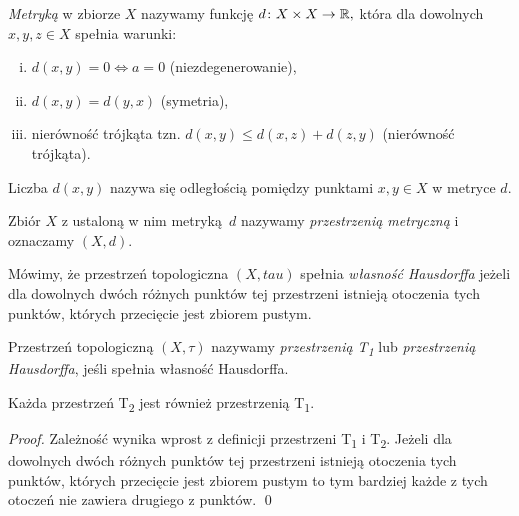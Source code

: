 {\begin{definition}
    \end{definition}
    \begin{definition}[Metryka]
        \label{def:metric}
        \emph{Metryką} w zbiorze $X$ nazywamy funkcję $d\colon X\times X\rightarrow \mathbb{R},$ która dla dowolnych $x, y, z\in X$ spełnia warunki:
        \begin{enumerate}[(i)]
            \item $d(x, y) = 0 \iff a = 0$ (niezdegenerowanie),
            \item $d(x, y) = d(y, x)$ (symetria),
            \item nierówność trójkąta tzn. $d(x, y) \leq d(x, z) + d(z, y)$ (nierówność trójkąta).
        \end{enumerate}            
    \end{definition}
    Liczba $d(x, y)$ nazywa się odległością pomiędzy punktami $x, y\in X$ w metryce $d$.
    \begin{definition}
        \label{def:metric_space}
        Zbiór $X$ z ustaloną w nim metryką~$d$ nazywamy \emph{przestrzenią metryczną} i oznaczamy $(X, d)$.
    \end{definition}
    \begin{definition}
        Mówimy, że przestrzeń topologiczna $(X, tau)$ spełnia \emph{własność Hausdorffa} jeżeli dla dowolnych dwóch różnych punktów tej przestrzeni istnieją otoczenia tych punktów, których przecięcie jest zbiorem pustym.
    \end{definition}
    \begin{definition}
        Przestrzeń topologiczną $(X, \tau)$ nazywamy \emph{przestrzenią T\textsubscript{1}} lub \emph{przestrzenią Hausdorffa}, jeśli spełnia własność Hausdorffa.
    \end{definition}
    \begin{remark}
        Każda przestrzeń T\textsubscript{2} jest również przestrzenią T\textsubscript{1}.
    \end{remark}
    \begin{proof}
        Zależność wynika wprost z definicji przestrzeni T\textsubscript{1} i  T\textsubscript{2}. Jeżeli dla dowolnych dwóch różnych punktów tej przestrzeni istnieją otoczenia tych punktów, których przecięcie jest zbiorem pustym to tym bardziej każde z tych otoczeń nie zawiera drugiego z punktów.  \qed
    \end{proof}
    \begin{definition}[Kula]
        \label{def:ball}

\end{definition}}

